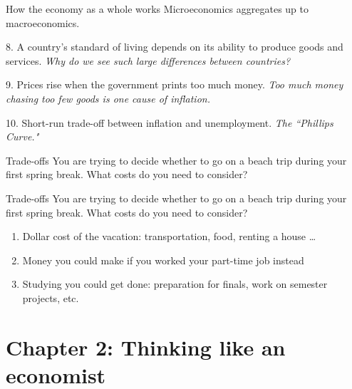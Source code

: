 \documentclass[compress]{beamer}
\begin{document}
\begin{frame}{How the economy as a whole works}
    Microeconomics aggregates up to macroeconomics.

    \medskip

    \begin{block}{8. A country's standard of living depends on its ability to produce goods and services.}
\textit{        Why do we see such large differences between countries?
}    \end{block}

    \begin{block}{9. Prices rise when the government prints too much money.}
\textit{        Too much money chasing too few goods is one cause of inflation.
}    \end{block}

    \begin{block}{10. Short-run trade-off between inflation and unemployment.}
\textit{        The ``Phillips Curve."
}    \end{block}
\end{frame} 

\begin{frame}{Trade-offs}
You are trying to decide whether to go on a beach trip during your first spring break. What costs do you need to consider? 
\end{frame}

\begin{frame}{Trade-offs}
    You are trying to decide whether to go on a beach trip during your first spring break. What costs do you need to consider? 

    \medskip

    \begin{enumerate}
        \item Dollar cost of the vacation: transportation, food, renting a house \dots
        \item Money you could make if you worked your part-time job instead
        \item Studying you could get done: preparation for finals, work on semester projects, etc.
    \end{enumerate}
\end{frame}

\section{Chapter 2: Thinking like an economist}
\end{document}
